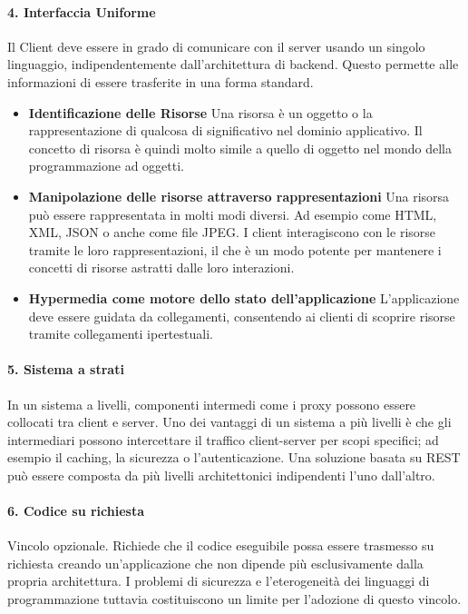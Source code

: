 \paragraph{4. Interfaccia Uniforme} Il Client deve essere in grado di comunicare con il server usando un singolo linguaggio, indipendentemente dall'architettura di backend. Questo permette alle informazioni di essere trasferite in una forma standard.

\begin{itemize}
    \item \textbf{Identificazione delle Risorse} Una risorsa è un oggetto o la rappresentazione di qualcosa di significativo nel dominio applicativo. Il concetto di risorsa è quindi molto simile a quello di oggetto nel mondo della programmazione ad oggetti.
    \item \textbf{Manipolazione delle risorse attraverso rappresentazioni} Una risorsa può essere rappresentata in molti modi diversi. Ad esempio come HTML, XML, JSON o anche come file JPEG. I client interagiscono con le risorse tramite le loro rappresentazioni, il che è un modo potente per mantenere i concetti di risorse astratti dalle loro interazioni.
    \item \textbf{Hypermedia come motore dello stato dell’applicazione} L’applicazione deve essere guidata da collegamenti, consentendo ai clienti di scoprire risorse tramite collegamenti ipertestuali.
\end{itemize}

\paragraph{5. Sistema a strati} In un sistema a livelli, componenti intermedi come i proxy possono essere collocati tra client e server.
Uno dei vantaggi di un sistema a più livelli è che gli intermediari possono intercettare il traffico client-server per scopi specifici; ad esempio il caching, la sicurezza o l'autenticazione. Una soluzione basata su REST può essere composta da più livelli architettonici indipendenti l’uno dall’altro.

\paragraph{6. Codice su richiesta} Vincolo opzionale. Richiede che il codice eseguibile possa essere trasmesso su richiesta creando un'applicazione che non dipende più esclusivamente dalla propria architettura. I problemi di sicurezza e l'eterogeneità dei linguaggi di programmazione tuttavia costituiscono un limite per l'adozione di questo vincolo.

